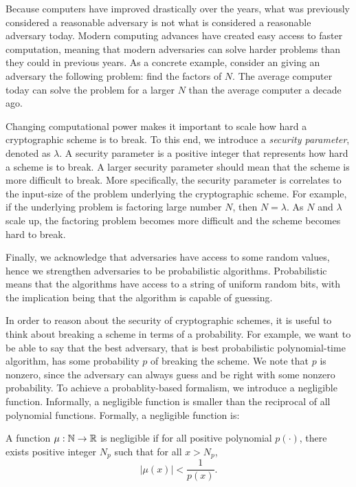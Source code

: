 Because computers have improved drastically over the years, what was previously considered a reasonable adversary is not what is considered a reasonable adversary today. 
Modern computing advances have created easy access to faster computation, meaning that modern adversaries can solve harder problems than they could in previous years. 
As a concrete example, consider an giving an adversary the following problem: find the factors of $N$. 
The average computer today can solve the problem for a larger $N$ than the average computer a decade ago.

Changing computational power makes it important to scale how hard a cryptographic scheme is to break.
To this end, we introduce a \textit{security parameter}, denoted as $\lambda$.
A security parameter is a positive integer that represents how hard a scheme is to break. 
A larger security parameter should mean that the scheme is more difficult to break. 
More specifically, the security parameter is correlates to the input-size of the problem underlying the cryptographic scheme. 
For example, if the underlying problem is factoring large number $N$, then $N = \lambda$. 
As $N$ and $\lambda$ scale up, the factoring problem becomes more difficult and the scheme becomes hard to break. 

Finally, we acknowledge that adversaries have access to some random values, hence we strengthen adversaries to be probabilistic algorithms. 
Probabilistic means that the algorithms have access to a string of uniform random bits, with the implication being that the algorithm is capable of guessing. 

In order to reason about the security of cryptographic schemes, it is useful to think about breaking a scheme in terms of a probability. 
For example, we want to be able to say that the best adversary, that is best probabilistic polynomial-time algorithm, has some probability $p$ of breaking the scheme. 
We note that $p$ is nonzero, since the adversary can always guess and be right with some nonzero probability. 
To achieve a probablity-based formalism, we introduce a negligible function.
Informally, a negligible function is smaller than the reciprocal of all polynomial functions. 
Formally, a negligible function is:

\begin{definition}
\label{defn:negible}
A function $\mu : \mathbb{N} \to \mathbb{R}$ is negligible if for all positive polynomial $p(\cdot)$, there exists positive integer $N_p$ such that for all $x > N_p$, 
\begin{equation}
    |\mu(x)| < \frac{1}{p(x)}.
\end{equation}
\cite{goldreich}
\end{definition}

